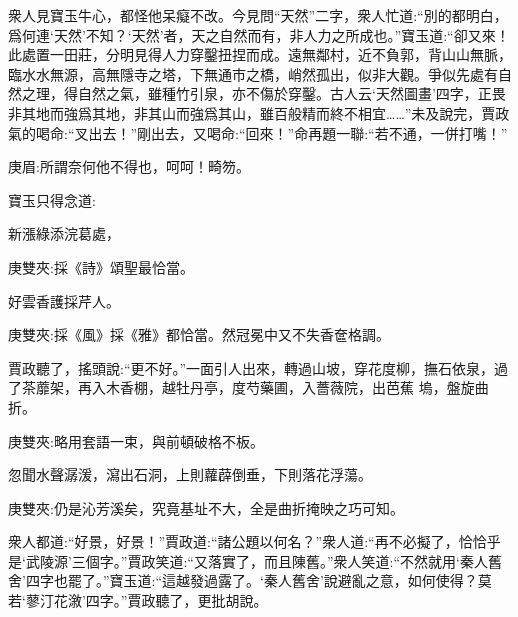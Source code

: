 \begin{parag}
    衆人見寶玉牛心，都怪他呆癡不改。今見問“天然”二字，衆人忙道:“別的都明白，爲何連‘天然’不知？‘天然’者，天之自然而有，非人力之所成也。”寶玉道:“卻又來！此處置一田莊，分明見得人力穿鑿扭捏而成。遠無鄰村，近不負郭，背山山無脈，臨水水無源，高無隱寺之塔，下無通市之橋，峭然孤出，似非大觀。爭似先處有自然之理，得自然之氣，雖種竹引泉，亦不傷於穿鑿。古人云‘天然圖畫’四字，正畏非其地而強爲其地，非其山而強爲其山，雖百般精而終不相宜……”未及說完，賈政氣的喝命:“叉出去！”剛出去，又喝命:“回來！”命再題一聯:“若不通，一併打嘴！”\begin{note}庚眉:所謂奈何他不得也，呵呵！畸笏。\end{note}寶玉只得念道:
\end{parag}


\begin{poem}
    \begin{pl} 新漲綠添浣葛處，\end{pl}
    \begin{note}庚雙夾:採《詩》頌聖最恰當。\end{note}

    \begin{pl} 好雲香護採芹人。\end{pl}
    \begin{note}庚雙夾:採《風》採《雅》都恰當。然冠冕中又不失香奩格調。\end{note}
\end{poem}


\begin{parag}
    賈政聽了，搖頭說:“更不好。”一面引人出來，轉過山坡，穿花度柳，撫石依泉，過了茶蘼架，再入木香棚，越牡丹亭，度芍藥圃，入薔薇院，出芭蕉 塢，盤旋曲折。\begin{note}庚雙夾:略用套語一束，與前頓破格不板。\end{note}忽聞水聲潺湲，瀉出石洞，上則蘿薜倒垂，下則落花浮蕩。\begin{note}庚雙夾:仍是沁芳溪矣，究竟基址不大，全是曲折掩映之巧可知。\end{note}衆人都道:“好景，好景！”賈政道:“諸公題以何名？”衆人道:“再不必擬了，恰恰乎是‘武陵源’三個字。”賈政笑道:“又落實了，而且陳舊。”衆人笑道:“不然就用‘秦人舊舍’四字也罷了。”寶玉道:“這越發過露了。‘秦人舊舍’說避亂之意，如何使得？莫若‘蓼汀花漵’四字。”賈政聽了，更批胡說。
\end{parag}


